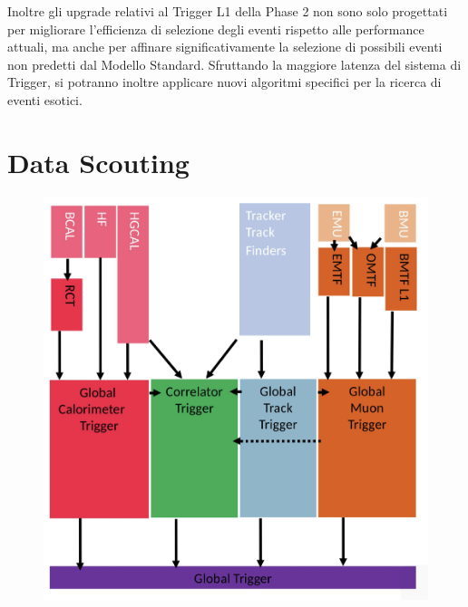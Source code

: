 Inoltre gli upgrade relativi al Trigger L1 della Phase 2 non sono solo progettati per migliorare l'efficienza di selezione degli eventi rispetto alle performance attuali, ma anche per affinare significativamente la selezione di possibili eventi non predetti dal Modello Standard. Sfruttando la maggiore latenza del sistema di Trigger, si potranno inoltre applicare nuovi algoritmi specifici per la ricerca di eventi esotici.


\section{Data Scouting}
\label{sec:DataScouting}


\begin{figure}[t]
  \centering
  \begin{minipage}[b]{0.43\textwidth}
      \centering
      \includegraphics[width=\textwidth]{../ImmaginiTesi/Phase2.png} 
    \end{minipage}
    \hfill 
    \begin{minipage}[b]{0.48\textwidth}
      \centering

\end{minipage}
\end{figure}
